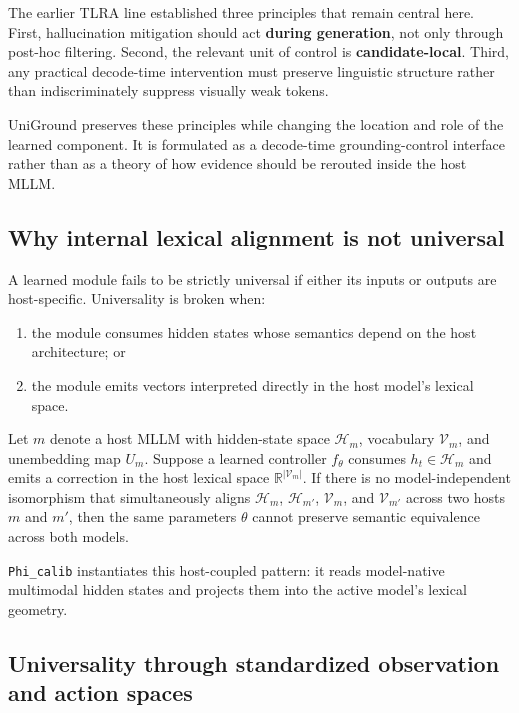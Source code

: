 The earlier TLRA line established three principles that remain central here. First, hallucination mitigation should act \textbf{during generation}, not only through post-hoc filtering. Second, the relevant unit of control is \textbf{candidate-local}. Third, any practical decode-time intervention must preserve linguistic structure rather than indiscriminately suppress visually weak tokens.

UniGround preserves these principles while changing the location and role of the learned component. It is formulated as a decode-time grounding-control interface rather than as a theory of how evidence should be rerouted inside the host MLLM.

\subsection{Why internal lexical alignment is not universal}

A learned module fails to be strictly universal if either its inputs or outputs are host-specific. Universality is broken when:
\begin{enumerate}
  \item the module consumes hidden states whose semantics depend on the host architecture; or
  \item the module emits vectors interpreted directly in the host model's lexical space.
\end{enumerate}

Let $m$ denote a host MLLM with hidden-state space $\mathcal{H}_m$, vocabulary $\mathcal{V}_m$, and unembedding map $U_m$. Suppose a learned controller $f_\theta$ consumes $h_t \in \mathcal{H}_m$ and emits a correction in the host lexical space $\mathbb{R}^{|\mathcal{V}_m|}$. If there is no model-independent isomorphism that simultaneously aligns $\mathcal{H}_m$, $\mathcal{H}_{m'}$, $\mathcal{V}_m$, and $\mathcal{V}_{m'}$ across two hosts $m$ and $m'$, then the same parameters $\theta$ cannot preserve semantic equivalence across both models.

\texttt{Phi\_calib} instantiates this host-coupled pattern: it reads model-native multimodal hidden states and projects them into the active model's lexical geometry.

\subsection{Universality through standardized observation and action spaces}

